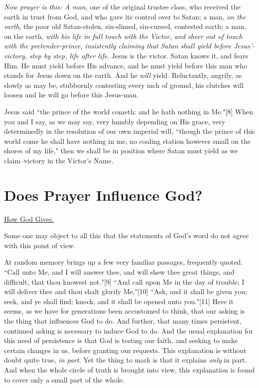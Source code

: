 \textit{Now prayer is this: A man}, one of the original trustee class, who
received the earth in trust from God, and who gave its control over to
Satan; a man, \textit{on the earth}, the poor old Satan-stolen, sin-slimed,
sin-cursed, contested earth; a man, on the earth, \textit{with his life in full
touch with the Victor, and sheer out of touch with the pretender-prince,
insistently claiming that Satan shall yield before Jesus'-victory, step by
step, life after life}. Jesus is the victor. Satan knows it, and fears
Him. He must yield before His advance, and he must yield before this man
who stands for Jesus down on the earth. And he \textit{will} yield. Reluctantly,
angrily, as slowly as may be, stubbornly contesting every inch of ground,
his clutches will loosen and he will go before this Jesus-man.

Jesus said ``the prince of the world cometh: and he hath nothing in Me."[8]
When you and I say, as we may say, very humbly depending on His grace,
very determinedly in the resolution of our own imperial will, ``though the
prince of this world come he shall have nothing in me, no coaling station
however small on the shores of my life," then we shall be in position
where Satan must yield as we claim--victory in the Victor's Name.




\chapter{Does Prayer Influence God?}



\underline{How God Gives.}


Some one may object to all this that the statements of God's word do not
agree with this point of view.

At random memory brings up a few very familiar passages, frequently
quoted. ``Call unto Me, and I will answer thee, and will shew thee great
things, and difficult, that thou knowest not."[9] ``And call upon Me in the
day of trouble; I will deliver thee and thou shalt glorify Me."[10] ``Ask,
and it shall be given you; seek, and ye shall find; knock, and it shall be
opened unto you."[11] Here it seems, as we have for generations been
accustomed to think, that our asking is the thing that influences God to
do. And further, that many times persistent, continued asking is necessary
to induce God to do. And the usual explanation for this need of
persistence is that God is testing our faith, and seeking to make certain
changes in us, before granting our requests. This explanation is without
doubt quite true, \textit{in part}. Yet the thing to mark is that it explains
\textit{only} in part. And when the whole circle of truth is brought into view,
this explanation is found to cover only a small part of the whole.

